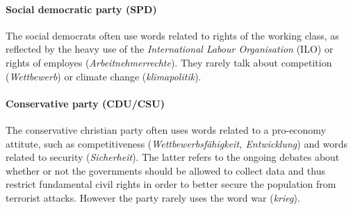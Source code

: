 \documentclass[runningheads,a4paper]{llncs}
\begin{document}
\paragraph{\bf Social democratic party (SPD)}
The social democrats often use words related to rights of the working class, as reflected by the heavy use of the {\em International Labour Organisation} (ILO) or rights of employes ({\em Arbeitnehmerrechte}). They rarely talk about competition ({\em Wettbewerb}) or climate change ({\em klimapolitik}). 

\paragraph{\bf Conservative party (CDU/CSU)}
The conservative christian party often uses words related to a pro-economy attitute, such as competitiveness ({\em Wettbewerbsf\"ahigkeit, Entwicklung}) and words related to security ({\em Sicherheit}). The latter refers to the ongoing debates about whether or not the governments should be allowed to collect data and thus restrict fundamental civil rights in order to better secure the population from terrorist attacks. However the party rarely uses the word war ({\em krieg}).
\end{document}
